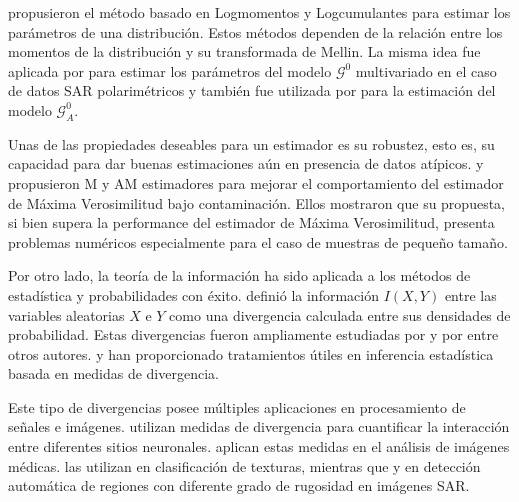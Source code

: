  \citet{nicolas2002} propusieron el método basado en Logmomentos y Logcumulantes para estimar los parámetros de una distribución. Estos métodos dependen de la relación entre los momentos de la distribución y su transformada de Mellin. La misma idea fue aplicada por \citet{khan2014} para estimar los parámetros del modelo $\mathcal{G}^0$ multivariado en el caso de datos SAR polarimétricos y también fue utilizada por \citet{Tison2004} para la estimación del modelo $\mathcal{G}^0_A$.

Unas de las propiedades deseables para un estimador es su robustez, esto es, su capacidad para dar buenas estimaciones aún en presencia de datos atípicos. \citet{BustosFreryLucini:Mestimators:2001} y \citet{AllendeFreryetal:JSCS:05} propusieron M y AM estimadores para mejorar el comportamiento del estimador de Máxima Verosimilitud bajo contaminación. Ellos mostraron que su propuesta, si bien supera la performance del estimador de Máxima Verosimilitud, presenta problemas numéricos especialmente para el caso de muestras de pequeño tamaño.

Por otro lado, la teoría de la información ha sido aplicada a los métodos de estadística y probabilidades con éxito. \citet{Shannon1948} definió la información $I(X,Y)$ entre las variables aleatorias $X$ e $Y$ como una divergencia calculada entre sus densidades de probabilidad. 
Estas divergencias fueron ampliamente estudiadas por \citet{KullbackLeibler1951} y por \citet{renyi1961} entre otros autores. \citet{pardo2005statistical} y \citet{Basu2011} han proporcionado tratamientos útiles en inferencia estadística basada en medidas de divergencia.

Este tipo de divergencias posee múltiples aplicaciones en procesamiento de señales e imágenes. 
\citet{Aviyente2007} utilizan medidas de divergencia para cuantificar la interacción entre diferentes sitios neuronales.
\citet{5599869} aplican estas medidas en el análisis de imágenes médicas.
\citet{1246862} las utilizan en clasificación de texturas, mientras que
\citet{6377288} y \citet{ClassificationPolSARSegmentsMinimizationWishartDistances} en detección automática de regiones con diferente grado de rugosidad en imágenes SAR.


